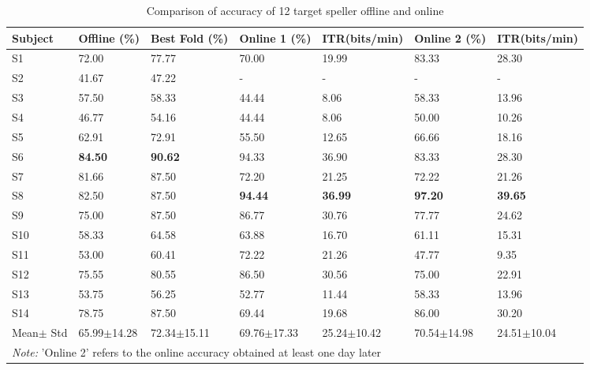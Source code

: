 \begin{table}[h]
\small
\caption{Comparison of accuracy of 12 target speller offline and online}
\label{tab:twelve-target-comparison}
\begin{tabular}{@{}p{1.8cm}p{2cm}p{2cm}p{2.2cm}p{2cm}p{2.2cm}p{2cm}@{}}
\toprule
Subject & Offline (\%) & Best Fold (\%) & Online 1 (\%) & ITR(bits/min) & Online 2 (\%) & ITR(bits/min) \\ \midrule
S1      & 72.00        & 77.77          & 70.00         & 19.99            & 83.33         & 28.30 \\
S2      & 41.67        & 47.22          & -             & -                & -             & - \\
S3      & 57.50        & 58.33          & 44.44         & 8.06             & 58.33         & 13.96 \\
S4      & 46.77        & 54.16          & 44.44         & 8.06             & 50.00         & 10.26 \\
S5      & 62.91        & 72.91          & 55.50         & 12.65            & 66.66         & 18.16 \\
S6      & \textbf{84.50}        & \textbf{90.62}          & 94.33         & 36.90            & 83.33         & 28.30 \\
S7      & 81.66        & 87.50          & 72.20         & 21.25            & 72.22         & 21.26 \\
S8      & 82.50        & 87.50          & \textbf{94.44}         & \textbf{36.99}            & \textbf{97.20}         & \textbf{39.65} \\
S9      & 75.00        & 87.50          & 86.77         & 30.76            & 77.77         & 24.62 \\
S10     & 58.33        & 64.58          & 63.88         & 16.70            & 61.11         & 15.31 \\
S11     & 53.00        & 60.41          & 72.22         & 21.26            & 47.77         & 9.35 \\
S12     & 75.55        & 80.55          & 86.50         & 30.56            & 75.00         & 22.91 \\
S13     & 53.75        & 56.25          & 52.77         & 11.44            & 58.33         & 13.96 \\
S14     & 78.75        & 87.50          & 69.44         & 19.68            & 86.00         & 30.20 \\ \bottomrule
Mean$\pm$ Std & 65.99$\pm$14.28 & 72.34$\pm$15.11 & 69.76$\pm$17.33 & 25.24$\pm$10.42 & 70.54$\pm$14.98 & 24.51$\pm$10.04 \\ \bottomrule
\multicolumn{7}{l}{\footnotesize\textit{Note:} 'Online 2' refers to the online accuracy obtained at least one day later}
\end{tabular}
\end{table}

